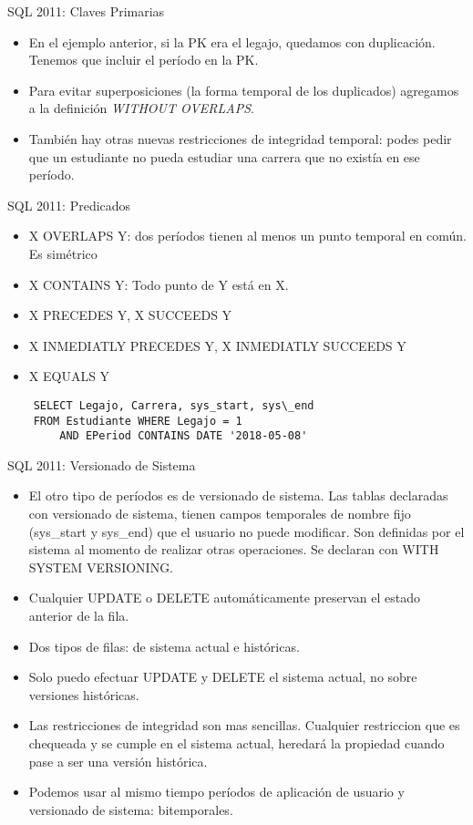 \documentclass[handout, t, aspectratio=169]{beamer}
\begin{document}
\begin{frame}{SQL 2011: Claves Primarias}
    \begin{itemize}
        \item En el ejemplo anterior, si la PK era el legajo, quedamos con duplicación. Tenemos que incluir el período en la PK.\pause
        \item Para evitar superposiciones (la forma temporal de los duplicados) agregamos a la definición \textit{WITHOUT OVERLAPS}.\pause
        \item También hay otras nuevas restricciones de integridad temporal: podes pedir que un estudiante no pueda estudiar una carrera que no existía en ese período.
    \end{itemize}
\end{frame}

\begin{frame}[fragile]{SQL 2011: Predicados}
    \begin{itemize}
        \item X OVERLAPS Y: dos períodos tienen al menos un punto temporal en común. Es simétrico\pause
        \item X CONTAINS Y: Todo punto de Y está en X.\pause
        \item X PRECEDES Y, X SUCCEEDS Y\pause
        \item X INMEDIATLY PRECEDES Y, X INMEDIATLY SUCCEEDS Y\pause
        \item X EQUALS Y \pause
    \end{itemize}
    \begin{verbatim}
    SELECT Legajo, Carrera, sys_start, sys\_end
    FROM Estudiante WHERE Legajo = 1
        AND EPeriod CONTAINS DATE '2018-05-08'
    \end{verbatim}
\end{frame}

\begin{frame}{SQL 2011: Versionado de Sistema}
    \begin{itemize}
        \item El otro tipo de períodos es de versionado de sistema. Las tablas declaradas con versionado de sistema, tienen campos temporales de nombre fijo (sys\_start y sys\_end) que el usuario no puede modificar. Son definidas por el sistema al momento de realizar otras operaciones. Se declaran con WITH SYSTEM VERSIONING.\pause
        \item Cualquier UPDATE o DELETE automáticamente preservan el estado anterior de la fila. \pause
        \item Dos tipos de filas: de sistema actual e históricas.\pause
        \item Solo puedo efectuar UPDATE y DELETE el sistema actual, no sobre versiones históricas.\pause
        \item Las restricciones de integridad son mas sencillas. Cualquier restriccion que es chequeada y se cumple en el sistema actual, heredará la propiedad cuando pase a ser una versión histórica.\pause
        \item Podemos usar al mismo tiempo períodos de aplicación de usuario y versionado de sistema: bitemporales.
    \end{itemize}
\end{frame}
\end{document}
